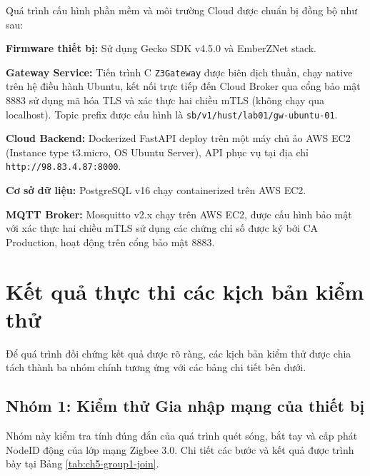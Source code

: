Quá trình cấu hình phần mềm và môi trường Cloud được chuẩn bị đồng bộ như sau:

\textbf{Firmware thiết bị:} Sử dụng Gecko SDK v4.5.0 và EmberZNet stack.

\textbf{Gateway Service:} Tiến trình C \texttt{Z3Gateway} được biên dịch thuần, chạy native trên hệ điều hành Ubuntu, kết nối trực tiếp đến Cloud Broker qua cổng bảo mật 8883 sử dụng mã hóa TLS và xác thực hai chiều mTLS (không chạy qua localhost). Topic prefix được cấu hình là \texttt{sb/v1/hust/lab01/gw-ubuntu-01}.

\textbf{Cloud Backend:} Dockerized FastAPI deploy trên một máy chủ ảo AWS EC2 (Instance type t3.micro, OS Ubuntu Server), API phục vụ tại địa chỉ \texttt{http://98.83.4.87:8000}.

\textbf{Cơ sở dữ liệu:} PostgreSQL v16 chạy containerized trên AWS EC2.

\textbf{MQTT Broker:} Mosquitto v2.x chạy trên AWS EC2, được cấu hình bảo mật với xác thực hai chiều mTLS sử dụng các chứng chỉ số được ký bởi CA Production, hoạt động trên cổng bảo mật 8883.

\section{Kết quả thực thi các kịch bản kiểm thử}
\label{sec:ch5-test-cases}

Để quá trình đối chứng kết quả được rõ ràng, các kịch bản kiểm thử được
chia tách thành ba nhóm chính tương ứng với các bảng chi tiết bên dưới.

\subsection{Nhóm 1: Kiểm thử Gia nhập mạng của thiết bị}
\label{sec:ch5-group1-join}

Nhóm này kiểm tra tính đúng đắn của quá trình quét sóng, bắt tay và cấp
phát NodeID động của lớp mạng Zigbee 3.0. Chi tiết các bước và kết quả
được trình bày tại Bảng \ref{tab:ch5-group1-join}.

